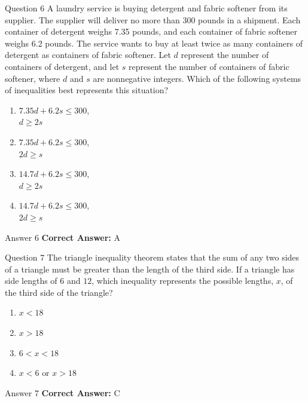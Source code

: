 \documentclass{beamer}
\begin{document}
\begin{frame}{Question 6}
\small
A laundry service is buying detergent and fabric softener from its supplier. The supplier will deliver no more than 300 pounds in a shipment. Each container of detergent weighs 7.35 pounds, and each container of fabric softener weighs 6.2 pounds. The service wants to buy at least twice as many containers of detergent as containers of fabric softener. Let \( d \) represent the number of containers of detergent, and let \( s \) represent the number of containers of fabric softener, where \( d \) and \( s \) are nonnegative integers. Which of the following systems of inequalities best represents this situation?
\vspace{0.35cm}
\begin{enumerate}
    \item[A.] $7.35d + 6.2s \leq 300$, \\ \hspace*{1.5em} $d \geq 2s$
    \item[B.] $7.35d + 6.2s \leq 300$, \\ \hspace*{1.5em} $2d \geq s$
    \item[C.] $14.7d + 6.2s \leq 300$, \\ \hspace*{1.5em} $d \geq 2s$
    \item[D.] $14.7d + 6.2s \leq 300$, \\ \hspace*{1.5em} $2d \geq s$
\end{enumerate}
\end{frame}
\begin{frame}{Answer 6}
\small
\textbf{Correct Answer:} A
\end{frame}

\begin{frame}{Question 7}
\small
The triangle inequality theorem states that the sum of any two sides of a triangle must be greater than the length of the third side. If a triangle has side lengths of $6$ and $12$, which inequality represents the possible lengths, $x$, of the third side of the triangle?
\vspace{0.35cm}
\begin{enumerate}
    \item[A.] $x < 18$
    \item[B.] $x > 18$
    \item[C.] $6 < x < 18$
    \item[D.] $x < 6 \text{ or } x > 18$
\end{enumerate}
\end{frame}
\begin{frame}{Answer 7}
\small
\textbf{Correct Answer:} C
\end{frame}
\end{document}
